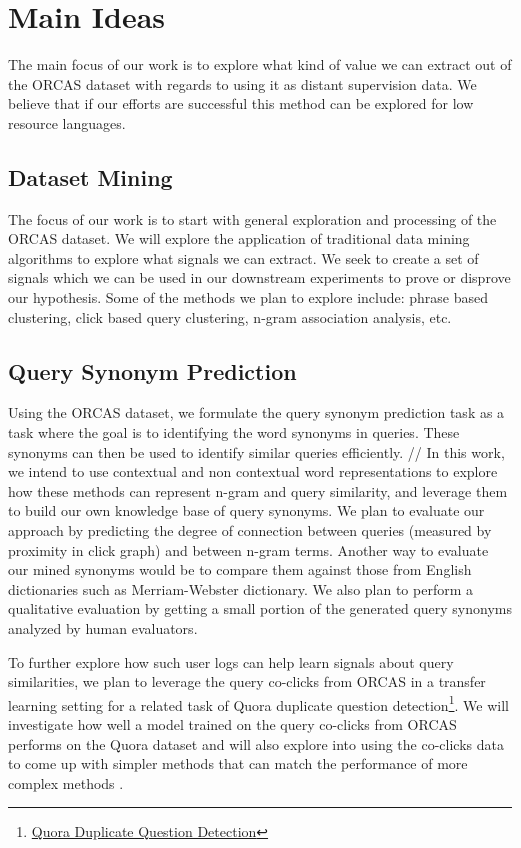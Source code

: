 \section{Main Ideas}
The main focus of our work is to explore what kind of value we can extract out of the ORCAS dataset with regards to using it as distant supervision data. We believe that if our efforts are successful this method can be explored for low resource languages.
\subsection{Dataset Mining}
The focus of our work is to start with general exploration and processing of the ORCAS dataset. We will explore the application of traditional data mining algorithms to explore what signals we can extract. We seek to create a set of signals which we can be used in our downstream experiments to prove or disprove our hypothesis. Some of the methods we plan to explore include: phrase based clustering, click based query clustering, n-gram association analysis, etc.
\subsection{Query Synonym Prediction}
Using the ORCAS dataset, we formulate the query synonym prediction task as a task where the goal is to identifying the word synonyms in queries. These synonyms can then be used to identify similar queries efficiently. //
In this work, we intend to use contextual and non contextual word representations to explore how these methods can represent n-gram and query similarity, and leverage them to build our own knowledge base of query synonyms. We plan to evaluate our approach by predicting the degree of connection between queries (measured by proximity in click graph) and between n-gram terms. Another way to evaluate our mined synonyms would be to compare them against those from English dictionaries such as Merriam-Webster dictionary. We also plan to perform a qualitative evaluation by getting a small portion of the generated query synonyms analyzed by human evaluators. 

To further explore how such user logs can help learn signals about query similarities, we plan to leverage the query co-clicks from ORCAS in a transfer learning setting for a related task of Quora duplicate question detection\footnote{\href{https://www.quora.com/q/quoradata/First-Quora-Dataset-Release-Question-Pairs}{Quora Duplicate Question Detection}}. We will investigate how well a model trained on the query co-clicks from ORCAS performs on the Quora dataset and will also explore into using the co-clicks data to come up with simpler methods that can match the performance of more complex methods \cite{chen2018quora, chandra2020experiments, abishek2019enhanced, dadashovquora}.


